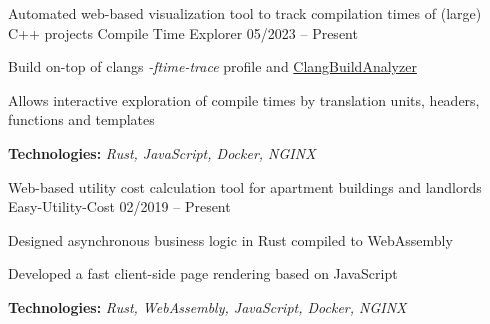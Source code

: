 \begin{cventries}
  \cventry
    {Automated web-based visualization tool to track compilation times of (large) C++ projects}
    {Compile Time Explorer}
    {}
    {05/2023 -- Present}
    {
      \begin{cvitems}
        \item {Build on-top of clangs \textit{-ftime-trace} profile and \href{https://github.com/aras-p/ClangBuildAnalyzer}{ClangBuildAnalyzer}}
        \item {Allows interactive exploration of compile times by translation units, headers, functions and templates}
        \item {\textbf{Technologies:} \textit{Rust, JavaScript, Docker, NGINX}}
      \end{cvitems}
    }
  \cventry
    {Web-based utility cost calculation tool for apartment buildings and landlords}
    {Easy-Utility-Cost}
    {}
    {02/2019 -- Present}
    {
      \begin{cvitems}
        \item {Designed asynchronous business logic in Rust compiled to WebAssembly}
        \item {Developed a fast client-side page rendering based on JavaScript}
        \item {\textbf{Technologies:} \textit{Rust, WebAssembly, JavaScript, Docker, NGINX}}
      \end{cvitems}
    }
\end{cventries}

